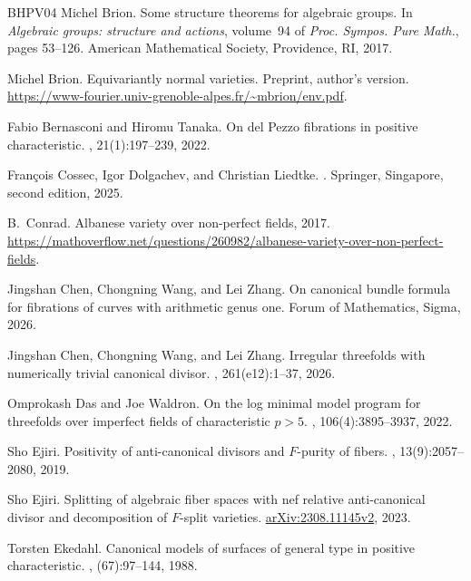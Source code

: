 \documentclass[10pt,abstract=true]{scrartcl}
\numberwithin{equation}{section}
\theoremstyle{definition}
\theoremstyle{remark}
\begin{document}
\begin{thebibliography}{BHPV04}
Michel Brion.
\newblock Some structure theorems for algebraic groups.
\newblock In {\em Algebraic groups: structure and actions}, volume~94 of {\em Proc. Sympos. Pure Math.}, pages 53--126. American Mathematical Society, Providence, RI, 2017.

Michel Brion.
\newblock Equivariantly normal varieties.
\newblock Preprint, author's version.
\newblock \url{https://www-fourier.univ-grenoble-alpes.fr/~mbrion/env.pdf}.

Fabio Bernasconi and Hiromu Tanaka.
\newblock On del {Pezzo} fibrations in positive characteristic.
, 21(1):197--239, 2022.

Fran\c{c}ois Cossec, Igor Dolgachev, and Christian Liedtke.
.
\newblock Springer, Singapore, second edition, 2025.

B.~Conrad.
\newblock Albanese variety over non-perfect fields, 2017.
\newblock \url{https://mathoverflow.net/questions/260982/albanese-variety-over-non-perfect-fields}.

Jingshan Chen, Chongning Wang, and Lei Zhang.
\newblock On canonical bundle formula for fibrations of curves with arithmetic genus one.
\newblock Forum of Mathematics, Sigma, 2026.


Jingshan Chen, Chongning Wang, and Lei Zhang.
\newblock Irregular threefolds with numerically trivial canonical divisor.
, 261(e12):1--37, 2026.

Omprokash Das and Joe Waldron.
\newblock On the log minimal model program for threefolds over imperfect fields of characteristic {$p>5$}.
, 106(4):3895--3937, 2022.

Sho Ejiri.
\newblock Positivity of anti-canonical divisors and {$F$}-purity of fibers.
, 13(9):2057--2080, 2019.

Sho Ejiri.
\newblock Splitting of algebraic fiber spaces with nef relative anti-canonical divisor and decomposition of {$F$}-split varieties.
\newblock \href{https://arxiv.org/abs/2308.11145v2}{arXiv:2308.11145v2}, 2023.

Torsten Ekedahl.
\newblock Canonical models of surfaces of general type in positive characteristic.
, (67):97--144, 1988.


\end{thebibliography}
\end{document}
